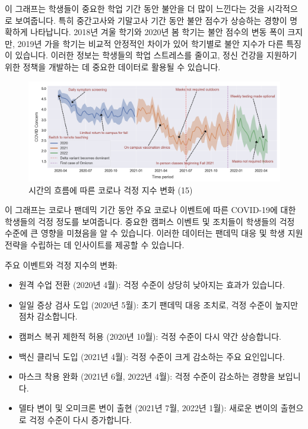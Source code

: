 \documentclass[
  letterpaper,
]{book}
\providecommand{\tightlist}{%
  \setlength{\itemsep}{0pt}\setlength{\parskip}{0pt}}\usepackage{longtable,booktabs,array}
\begin{document}
이 그래프는 학생들이 중요한 학업 기간 동안 불안을 더 많이 느낀다는 것을
시각적으로 보여줍니다. 특히 중간고사와 기말고사 기간 동안 불안 점수가
상승하는 경향이 명확하게 나타납니다. 2018년 겨울 학기와 2020년 봄 학기는
불안 점수의 변동 폭이 크지만, 2019년 가을 학기는 비교적 안정적인 차이가
있어 학기별로 불안 지수가 다른 특징이 있습니다. 이러한 정보는 학생들의
학업 스트레스를 줄이고, 정신 건강을 지원하기 위한 정책을 개발하는 데
중요한 데이터로 활용될 수 있습니다.

\begin{figure}[H]

{\centering \includegraphics{img/fig16.png}

}

\caption{시간의 흐름에 따른 코로나 걱정 지수 변화 (15)}

\end{figure}%

이 그래프는 코로나 팬데믹 기간 동안 주요 코로나 이벤트에 따른 COVID-19에
대한 학생들의 걱정 정도를 보여줍니다. 중요한 캠퍼스 이벤트 및 조치들이
학생들의 걱정 수준에 큰 영향을 미쳤음을 알 수 있습니다. 이러한 데이터는
팬데믹 대응 및 학생 지원 전략을 수립하는 데 인사이트를 제공할 수
있습니다.

주요 이벤트와 걱정 지수의 변화:

\begin{itemize}
\tightlist
\item
  원격 수업 전환 (2020년 4월): 걱정 수준이 상당히 낮아지는 효과가
  있습니다.
\item
  일일 증상 검사 도입 (2020년 5월): 초기 팬데믹 대응 조치로, 걱정 수준이
  높지만 점차 감소합니다.
\item
  캠퍼스 복귀 제한적 허용 (2020년 10월): 걱정 수준이 다시 약간
  상승합니다.
\item
  백신 클리닉 도입 (2021년 4월): 걱정 수준이 크게 감소하는 주요
  요인입니다.
\item
  마스크 착용 완화 (2021년 6월, 2022년 4월): 걱정 수준이 감소하는 경향을
  보입니다.
\item
  델타 변이 및 오미크론 변이 출현 (2021년 7월, 2022년 1월): 새로운
  변이의 출현으로 걱정 수준이 다시 증가합니다.
\end{itemize}
\end{document}

